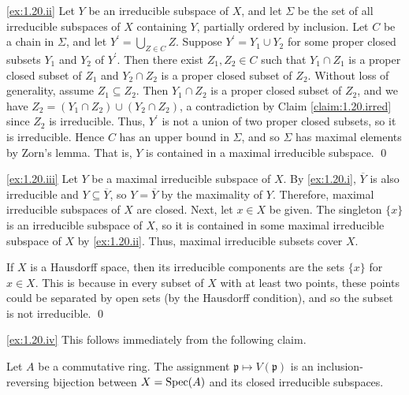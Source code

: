 \noindent
\ref{ex:1.20.ii}
Let $Y$ be an irreducible subspace of $X$, and let $\Sigma$ be the set of all irreducible subspaces of $X$ containing $Y$, partially ordered by inclusion.
Let $C$ be a chain in $\Sigma$, and let $Y^\prime = \bigcup_{Z\in C} Z$.
Suppose $Y^\prime = Y_1 \cup Y_2$ for some proper closed subsets $Y_1$ and $Y_2$ of $Y^\prime$.
Then there exist $Z_1,Z_2\in C$ such that $Y_1\cap Z_1$ is a proper closed subset of $Z_1$ and $Y_2 \cap Z_2$ is a proper closed subset of $Z_2$.
Without loss of generality, assume $Z_1 \subseteq Z_2$.
Then $Y_1 \cap Z_2$ is a proper closed subset of $Z_2$, and we have $Z_2 = (Y_1 \cap Z_2) \cup (Y_2 \cap Z_2)$, a contradiction by Claim \ref{claim:1.20.irred} since $Z_2$ is irreducible.
Thus, $Y^\prime$ is not a union of two proper closed subsets, so it is irreducible.
Hence $C$ has an upper bound in $\Sigma$, and so $\Sigma$ has maximal elements by Zorn's lemma.
That is, $Y$ is contained in a maximal irreducible subspace.
\qed

\noindent
\ref{ex:1.20.iii}
Let $Y$ be a maximal irreducible subspace of $X$.
By \ref{ex:1.20.i}, $\overline Y$ is also irreducible and $Y \subseteq \overline Y$, so $Y = \overline Y$ by the maximality of $Y$.
Therefore, maximal irreducible subspaces of $X$ are closed.
Next, let $x\in X$ be given.
The singleton $\{x\}$ is an irreducible subspace of $X$, so it is contained in some maximal irreducible subspace of $X$ by \ref{ex:1.20.ii}.
Thus, maximal irreducible subsets cover $X$.

If $X$ is a Hausdorff space, then its irreducible components are the sets $\{x\}$ for $x \in X$.
This is because in every subset of $X$ with at least two points, these points could be separated by open sets (by the Hausdorff condition), and so the subset is not irreducible.
\qed

\noindent
\ref{ex:1.20.iv}
This follows immediately from the following claim.

\begin{claim}
\label{claim:1.20.prime}
Let $A$ be a commutative ring.
The assignment $\mathfrak p \mapsto V(\mathfrak p)$ is an inclusion-reversing bijection between $X=\operatorname{Spec}(A)$ and its closed irreducible subspaces.
\end{claim}

